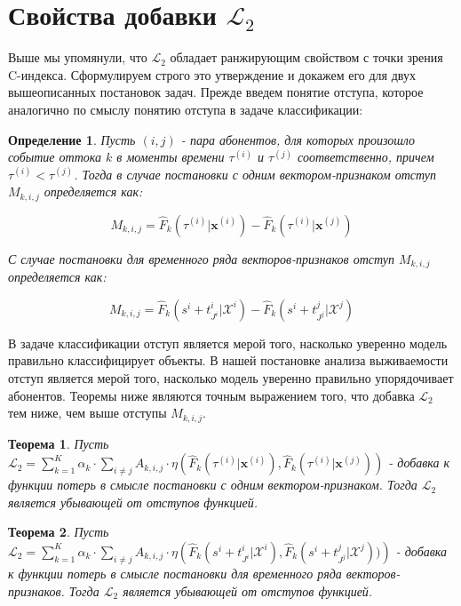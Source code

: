 \documentclass[a4paper,14pt,oneside,openany]{memoir}
\newtheorem{definition}{Определение}
\newtheorem{theorem}{Теорема}
\begin{document}
\section{Свойства добавки $\mathcal{L}_2$}

Выше мы упомянули, что $\mathcal{L}_2$ обладает ранжирующим свойством с точки зрения C-индекса. Сформулируем строго это утверждение и докажем его для двух вышеописанных постановок задач. Прежде введем понятие отступа, которое аналогично по смыслу понятию отступа в задаче классификации: 

\begin{definition}
Пусть $(i,j)$ - пара абонентов, для которых произошло событие оттока $k$ в моменты времени $\tau^{(i)}$ и $\tau^{(j)}$ соответственно, причем $\tau^{(i)} < \tau^{(j)}$. Тогда в случае постановки с одним вектором-признаком отступ $M_{k,i,j}$ определяется как: 

$$M_{k,i,j} = \hat{F}_k(\tau^{(i)}|\mathbf{x}^{(i)}) - \hat{F}_k(\tau^{(i)}|\mathbf{x}^{(j)}) $$ 

С случае постановки для временного ряда векторов-признаков отступ $M_{k,i,j}$ определяется как:

$$M_{k,i,j} = \hat{F}_k(s^i+t_{J^i}^i|\mathcal{X}^i) - \hat{F}_k(s^i+t_{J^j}^j|\mathcal{X}^j)$$

\end{definition}

В задаче классификации отступ является мерой того, насколько уверенно модель правильно классифицирует объекты. В нашей постановке анализа выживаемости отступ является мерой того, насколько модель уверенно правильно упорядочивает абонентов. Теоремы ниже являются точным выражением того, что добавка $\mathcal{L}_2$ тем ниже, чем выше отступы $M_{k,i,j}$. 

\begin{theorem}
	Пусть $\mathcal{L}_2 =\sum_{k=1}^K\alpha_k\cdot\sum_{i\neq j}A_{k,i,j}\cdot\eta\left(\hat{F}_k(\tau^{(i)}|\mathbf{x}^{(i)}),\hat{F}_k(\tau^{(i)}|\mathbf{x}^{(j)})\right)$ - добавка к функции потерь в смысле постановки с одним вектором-признаком. Тогда $\mathcal{L}_2$ является убывающей от отступов функцией.  
\end{theorem}

\begin{theorem}
	Пусть $\mathcal{L}_2 =\sum_{k=1}^K\alpha_k\cdot\sum_{i\neq j}A_{k,i,j}\cdot\eta\left(\hat{F}_k(s^i+t_{J^i}^i|\mathcal{X}^i) , \hat{F}_k(s^i+t_{J^j}^j|\mathcal{X}^j))\right)$ - добавка к функции потерь в смысле постановки для временного ряда векторов-признаков. Тогда $\mathcal{L}_2$ является убывающей от отступов функцией.  
\end{theorem}
\end{document}
